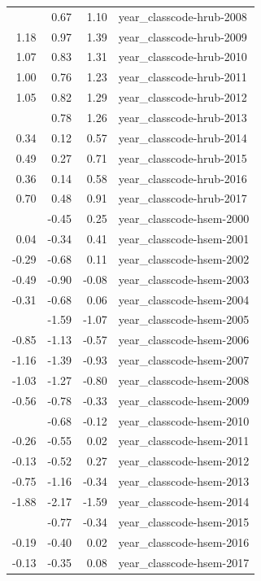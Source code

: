 \documentclass[]{article}
\begin{document}
\begin{longtable}[t]{rrrl}
\addlinespace
0.89 & 0.67 & 1.10 & year\_classcode-hrub-2008\\
1.18 & 0.97 & 1.39 & year\_classcode-hrub-2009\\
1.07 & 0.83 & 1.31 & year\_classcode-hrub-2010\\
1.00 & 0.76 & 1.23 & year\_classcode-hrub-2011\\
1.05 & 0.82 & 1.29 & year\_classcode-hrub-2012\\
\addlinespace
1.02 & 0.78 & 1.26 & year\_classcode-hrub-2013\\
0.34 & 0.12 & 0.57 & year\_classcode-hrub-2014\\
0.49 & 0.27 & 0.71 & year\_classcode-hrub-2015\\
0.36 & 0.14 & 0.58 & year\_classcode-hrub-2016\\
0.70 & 0.48 & 0.91 & year\_classcode-hrub-2017\\
\addlinespace
-0.10 & -0.45 & 0.25 & year\_classcode-hsem-2000\\
0.04 & -0.34 & 0.41 & year\_classcode-hsem-2001\\
-0.29 & -0.68 & 0.11 & year\_classcode-hsem-2002\\
-0.49 & -0.90 & -0.08 & year\_classcode-hsem-2003\\
-0.31 & -0.68 & 0.06 & year\_classcode-hsem-2004\\
\addlinespace
-1.33 & -1.59 & -1.07 & year\_classcode-hsem-2005\\
-0.85 & -1.13 & -0.57 & year\_classcode-hsem-2006\\
-1.16 & -1.39 & -0.93 & year\_classcode-hsem-2007\\
-1.03 & -1.27 & -0.80 & year\_classcode-hsem-2008\\
-0.56 & -0.78 & -0.33 & year\_classcode-hsem-2009\\
\addlinespace
-0.40 & -0.68 & -0.12 & year\_classcode-hsem-2010\\
-0.26 & -0.55 & 0.02 & year\_classcode-hsem-2011\\
-0.13 & -0.52 & 0.27 & year\_classcode-hsem-2012\\
-0.75 & -1.16 & -0.34 & year\_classcode-hsem-2013\\
-1.88 & -2.17 & -1.59 & year\_classcode-hsem-2014\\
\addlinespace
-0.56 & -0.77 & -0.34 & year\_classcode-hsem-2015\\
-0.19 & -0.40 & 0.02 & year\_classcode-hsem-2016\\
-0.13 & -0.35 & 0.08 & year\_classcode-hsem-2017\\

\end{longtable}
\end{document}
